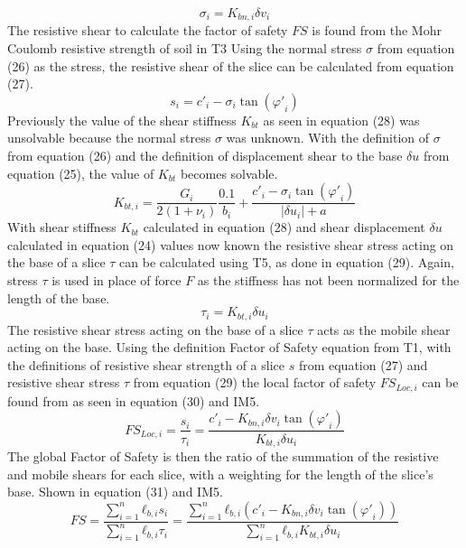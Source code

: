 \documentclass[12pt]{article}
\begin{document}
\begin{dmath}
σ_{i}={K_{bn,i}} {δv}_{i}
\end{dmath}
The resistive shear to calculate the factor of safety $FS$ is found from the Mohr Coulomb resistive strength of soil in T3 Using the normal stress $σ$ from equation (26) as the stress, the resistive shear of the slice can be calculated from equation (27).
\begin{dmath}
s_{i}={c'}_{i}-σ_{i} \tan\left({φ'}_{i}\right)
\end{dmath}
Previously the value of the shear stiffness ${K_{bt}}$ as seen in equation (28) was unsolvable because the normal stress $σ$ was unknown. With the definition of $σ$ from equation (26) and the definition of displacement shear to the base $δu$ from equation (25), the value of ${K_{bt}}$ becomes solvable.
\begin{dmath}
{K_{bt,i}}=\frac{G_{i}}{2 \left(1+ν_{i}\right)} \frac{0.1}{b_{i}}+\frac{{c'}_{i}-σ_{i} \tan\left({φ'}_{i}\right)}{|{δu}_{i}|+a}
\end{dmath}
With shear stiffness ${K_{bt}}$ calculated in equation (28) and shear displacement $δu$ calculated in equation (24) values now known the resistive shear stress acting on the base of a slice $τ$ can be calculated using T5, as done in equation (29). Again, stress $τ$ is used in place of force $F$ as the stiffness has not been normalized for the length of the base.
\begin{dmath}
τ_{i}={K_{bt,i}} {δu}_{i}
\end{dmath}
The resistive shear stress acting on the base of a slice $τ$ acts as the mobile shear acting on the base. Using the definition Factor of Safety equation from T1, with the definitions of resistive shear strength of a slice $s$ from equation (27) and resistive shear stress $τ$ from equation (29) the local factor of safety ${FS_{Loc,i}}$ can be found from as seen in equation (30) and IM5.
\begin{dmath}
{FS_{Loc,i}}=\frac{s_{i}}{τ_{i}}=\frac{{c'}_{i}-{K_{bn,i}} {δv}_{i} \tan\left({φ'}_{i}\right)}{{K_{bt,i}} {δu}_{i}}
\end{dmath}
The global Factor of Safety is then the ratio of the summation of the resistive and mobile shears for each slice, with a weighting for the length of the slice's base. Shown in equation (31) and IM5.
\begin{dmath}
FS=\frac{\displaystyle\sum_{i=1}^{n}{{ℓ_{b,i}} s_{i}}}{\displaystyle\sum_{i=1}^{n}{{ℓ_{b,i}} τ_{i}}}=\frac{\displaystyle\sum_{i=1}^{n}{{ℓ_{b,i}} \left({c'}_{i}-{K_{bn,i}} {δv}_{i} \tan\left({φ'}_{i}\right)\right)}}{\displaystyle\sum_{i=1}^{n}{{ℓ_{b,i}} {K_{bt,i}} {δu}_{i}}}
\end{dmath}
\end{document}
